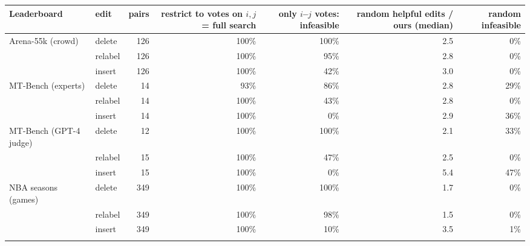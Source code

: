 \begin{tabular}{llrrrrr}\toprule
Leaderboard & edit & pairs & restrict to votes on $i,j$ = full search & only $i$--$j$ votes: infeasible & random helpful edits / ours (median) & random infeasible \\\midrule
Arena-55k (crowd) & delete & 126 & 100\% & 100\% & 2.5 & 0\% \\
 & relabel & 126 & 100\% & 95\% & 2.8 & 0\% \\
 & insert & 126 & 100\% & 42\% & 3.0 & 0\% \\
\addlinespace
MT-Bench (experts) & delete & 14 & 93\% & 86\% & 2.8 & 29\% \\
 & relabel & 14 & 100\% & 43\% & 2.8 & 0\% \\
 & insert & 14 & 100\% & 0\% & 2.9 & 36\% \\
\addlinespace
MT-Bench (GPT-4 judge) & delete & 12 & 100\% & 100\% & 2.1 & 33\% \\
 & relabel & 15 & 100\% & 47\% & 2.5 & 0\% \\
 & insert & 15 & 100\% & 0\% & 5.4 & 47\% \\
\addlinespace
NBA seasons (games) & delete & 349 & 100\% & 100\% & 1.7 & 0\% \\
 & relabel & 349 & 100\% & 98\% & 1.5 & 0\% \\
 & insert & 349 & 100\% & 10\% & 3.5 & 1\% \\
\addlinespace
\bottomrule\end{tabular}
